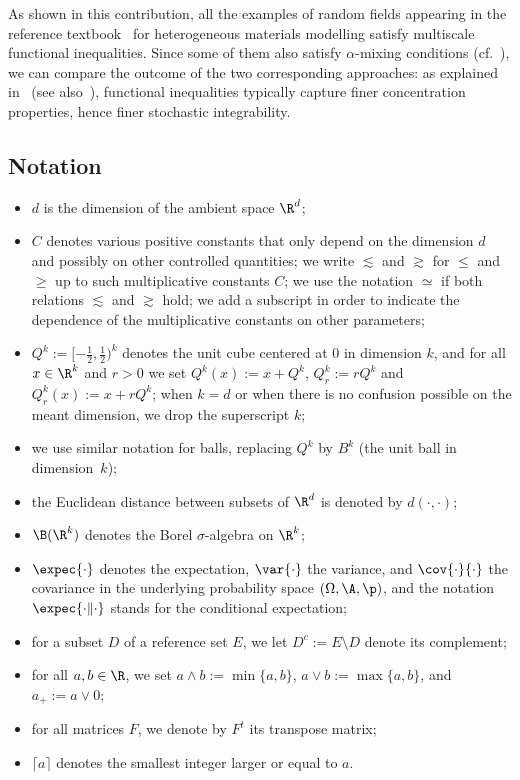 

As shown in this contribution, all the examples of random fields appearing in the reference textbook~\cite{Torquato-02} for heterogeneous materials modelling satisfy multiscale functional inequalities. Since some of them also satisfy $\alpha$-mixing conditions (cf.~\cite[Proposition~1.4]{DG1}), we can compare the outcome of the two corresponding approaches: as explained in~\cite[Section~1.3]{DG1} (see also~\cite[Corollary~8]{GNO-reg}), functional inequalities typically capture finer concentration properties, hence finer stochastic integrability.

\pagebreak
\subsection*{Notation}
\begin{itemize}
\item $d$ is the dimension of the ambient space $\R^d$;
\item $C$ denotes various positive constants that only depend on the dimension $d$ and possibly on other controlled quantities; we write $\lesssim$ and $\gtrsim$ for $\le$ and $\ge$ up to such multiplicative constants $C$; we use the notation $\simeq$ if both relations $\lesssim$ and $\gtrsim$ hold; we add a subscript in order to indicate the dependence of the multiplicative constants on other parameters;
\item $Q^k:=[-\frac12,\frac12)^k$ denotes the unit cube centered at $0$ in dimension $k$, and for all $x\in\R^k$ and $r>0$ we set $Q^k(x):=x+Q^k$, $Q_r^k:=rQ^k$ and $Q_r^k(x):=x+rQ^k$; when $k=d$ or when there is no confusion possible on the meant dimension, we drop the superscript $k$;
\item we use similar notation for balls, replacing $Q^k$ by $B^k$ (the unit ball in dimension~$k$);
\item the Euclidean distance between subsets of $\R^d$ is denoted by $d(\cdot,\cdot)$;
\item $\B(\R^k)$ denotes the Borel $\sigma$-algebra on $\R^k$;
\item $\expec{\cdot}$ denotes the expectation, $\var{\cdot}$ the variance, and $\cov{\cdot}{\cdot}$ the covariance in the underlying probability space $(\Omega,\A,\p)$, and the notation $\expec{\cdot \| \cdot}$ stands for the conditional expectation;
\item for a subset $D$ of a reference set $E$, we let $D^c:=E\setminus D$ denote its complement;
\item for all $a,b\in \R$, we set $a\wedge b:=\min\{a,b\}$, $a\vee b:=\max\{a,b\}$, and $a_+:=a\vee0$;
\item for all matrices $F$, we denote by $F^t$ its transpose matrix;
\item $\lceil a \rceil$ denotes the smallest integer larger or equal to $a$.
\end{itemize}

